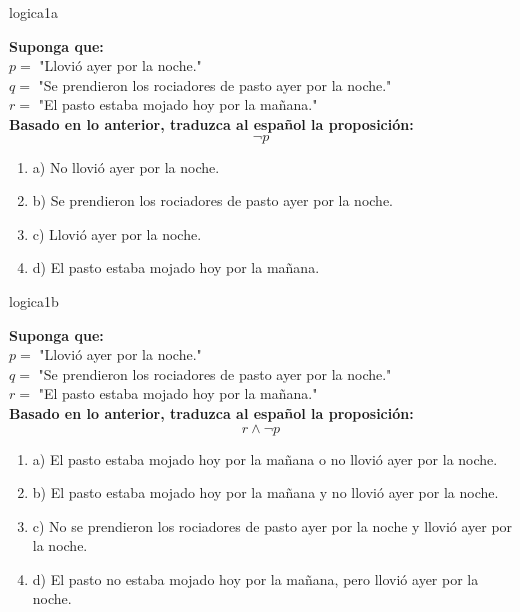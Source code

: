 \documentclass{article}
\begin{document}
\begin{question}{4}{logica}{1}{a}{
\textbf{Suponga que:}\\
\(p =\) "Llovió ayer por la noche."\\
\(q =\) "Se prendieron los rociadores de pasto ayer por la noche."\\
\(r =\) "El pasto estaba mojado hoy por la mañana."\\
\textbf{Basado en lo anterior, traduzca al español la proposición:}\\
$$\neg p$$

\begin{enumerate}
    \item a) No llovió ayer por la noche.
    \item b) Se prendieron los rociadores de pasto ayer por la noche.
    \item c) Llovió ayer por la noche.
    \item d) El pasto estaba mojado hoy por la mañana.
\end{enumerate}
}
\end{question}

\begin{question}{5}{logica}{1}{b}{
\textbf{Suponga que:}\\
\(p =\) "Llovió ayer por la noche."\\
\(q =\) "Se prendieron los rociadores de pasto ayer por la noche."\\
\(r =\) "El pasto estaba mojado hoy por la mañana."\\
\textbf{Basado en lo anterior, traduzca al español la proposición:}\\
$$
r \land \neg p
$$

\begin{enumerate}
    \item a) El pasto estaba mojado hoy por la mañana o no llovió ayer por la noche.
    \item b) El pasto estaba mojado hoy por la mañana y no llovió ayer por la noche.
    \item c) No se prendieron los rociadores de pasto ayer por la noche y llovió ayer por la noche.
    \item d) El pasto no estaba mojado hoy por la mañana, pero llovió ayer por la noche.
\end{enumerate}
}
\end{question}
\end{document}
